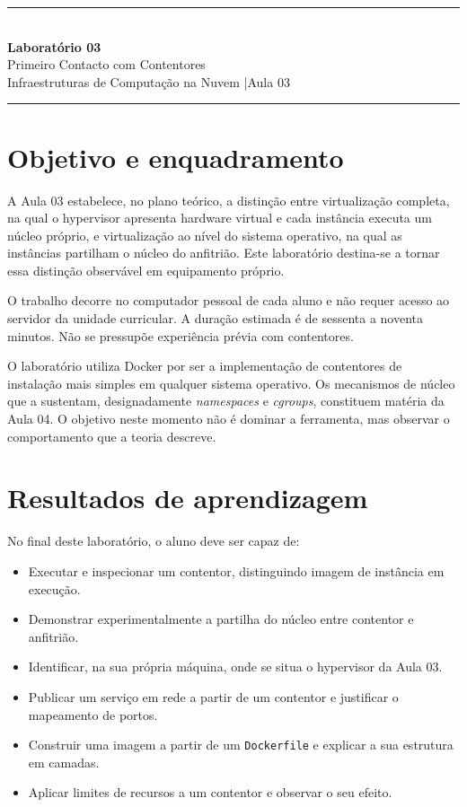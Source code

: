 \documentclass[11pt,a4paper]{article}
\newcommand{\labtitle}[3]{%
  \thispagestyle{empty}
  \begin{center}
  {\color{NudeTaupe}\rule{\textwidth}{0.5pt}}\\[0.5cm]
  {\LARGE\bfseries\color{TextEspresso} Laboratório #1}\\[0.35cm]
  {\large\color{TextEspresso} #2}\\[0.3cm]
  {\normalsize\color{NudeTaupe} Infraestruturas de Computação na Nuvem \quad|\quad #3}\\[0.4cm]
  {\color{NudeTaupe}\rule{\textwidth}{0.5pt}}
  \end{center}
  \vspace{0.4cm}
}
\begin{document}
\labtitle{03}{Primeiro Contacto com Contentores}{Aula 03}

\section*{Objetivo e enquadramento}

A Aula 03 estabelece, no plano teórico, a distinção entre virtualização completa, na qual o hypervisor apresenta hardware virtual e cada instância executa um núcleo próprio, e virtualização ao nível do sistema operativo, na qual as instâncias partilham o núcleo do anfitrião. Este laboratório destina-se a tornar essa distinção observável em equipamento próprio.

O trabalho decorre no computador pessoal de cada aluno e não requer acesso ao servidor da unidade curricular. A duração estimada é de sessenta a noventa minutos. Não se pressupõe experiência prévia com contentores.

\begin{nota}
O laboratório utiliza Docker por ser a implementação de contentores de instalação mais simples em qualquer sistema operativo. Os mecanismos de núcleo que a sustentam, designadamente \emph{namespaces} e \emph{cgroups}, constituem matéria da Aula 04. O objetivo neste momento não é dominar a ferramenta, mas observar o comportamento que a teoria descreve.
\end{nota}

\section*{Resultados de aprendizagem}

No final deste laboratório, o aluno deve ser capaz de:

\begin{itemize}
  \item Executar e inspecionar um contentor, distinguindo imagem de instância em execução.
  \item Demonstrar experimentalmente a partilha do núcleo entre contentor e anfitrião.
  \item Identificar, na sua própria máquina, onde se situa o hypervisor da Aula 03.
  \item Publicar um serviço em rede a partir de um contentor e justificar o mapeamento de portos.
  \item Construir uma imagem a partir de um \texttt{Dockerfile} e explicar a sua estrutura em camadas.
  \item Aplicar limites de recursos a um contentor e observar o seu efeito.
\end{itemize}
\end{document}

